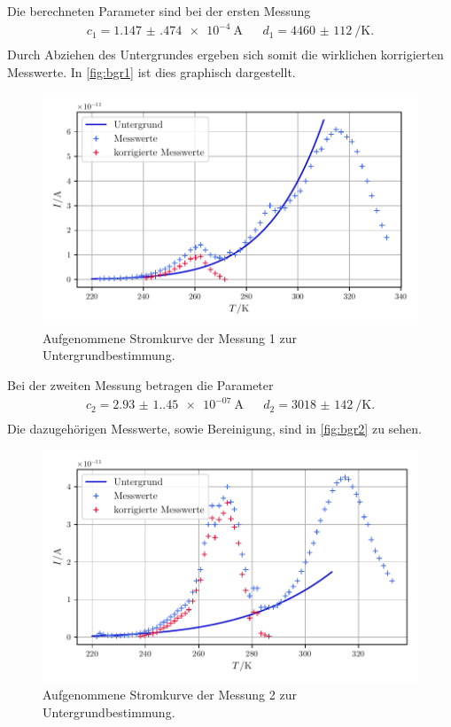 Die berechneten Parameter sind bei der ersten Messung
\begin{align}
    c_1 = \qty{1.147(474)e-4}{\ampere} && d_1 = \qty{4460(112)}{\per\kelvin}.\\
\end{align}
Durch Abziehen des Untergrundes ergeben sich somit die wirklichen korrigierten Messwerte.
In \autoref{fig:bgr1} ist dies graphisch dargestellt.
\begin{figure}
    \centering
    \includegraphics[width=0.8\linewidth]{scripts/build/plot1_bgr.pdf}
    \caption{Aufgenommene Stromkurve der Messung 1 zur Untergrundbestimmung.}%
    \label{fig:bgr1}
\end{figure}

Bei der zweiten Messung betragen die Parameter
\begin{align}
    c_2 = \qty{2.93(1.45)e-07}{\ampere} && d_2 = \qty{3018(142)}{\per\kelvin}.\\
\end{align}
Die dazugehörigen Messwerte, sowie Bereinigung, sind in \autoref{fig:bgr2} zu sehen.
\begin{figure}
    \centering
    \includegraphics[width=0.8\linewidth]{scripts/build/plot2_bgr.pdf}
    \caption{Aufgenommene Stromkurve der Messung 2 zur Untergrundbestimmung.}%
    \label{fig:bgr2}
\end{figure}

